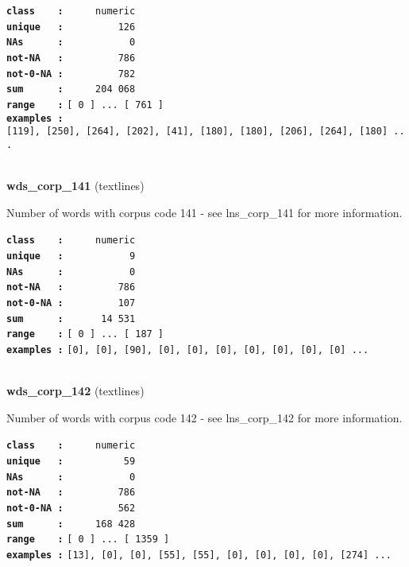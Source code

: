 \documentclass[]{article}
\begin{document}
\textbf{\texttt{class\ \ \ \ :}} \texttt{~~~~~numeric}\\
\textbf{\texttt{unique\ \ \ :}} \texttt{~~~~~~~~~126}\\
\textbf{\texttt{NAs\ \ \ \ \ \ :}} \texttt{~~~~~~~~~~~0}\\
\textbf{\texttt{not-NA\ \ \ :}} \texttt{~~~~~~~~~786}\\
\textbf{\texttt{not-0-NA\ :}} \texttt{~~~~~~~~~782}\\
\textbf{\texttt{sum\ \ \ \ \ \ :}} \texttt{~~~~~204~068}\\
\textbf{\texttt{range\ \ \ \ :}}
\texttt{{[}\ 0\ {]}\ ...\ {[}\ 761\ {]}}\\
\textbf{\texttt{examples\ :}}
\texttt{{[}119{]},\ {[}250{]},\ {[}264{]},\ {[}202{]},\ {[}41{]},\ {[}180{]},\ {[}180{]},\ {[}206{]},\ {[}264{]},\ {[}180{]}\ ...}\\

~

\textbf{wds\_corp\_141} (textlines)

Number of words with corpus code 141 - see lns\_corp\_141 for more
information.

\textbf{\texttt{class\ \ \ \ :}} \texttt{~~~~~numeric}\\
\textbf{\texttt{unique\ \ \ :}} \texttt{~~~~~~~~~~~9}\\
\textbf{\texttt{NAs\ \ \ \ \ \ :}} \texttt{~~~~~~~~~~~0}\\
\textbf{\texttt{not-NA\ \ \ :}} \texttt{~~~~~~~~~786}\\
\textbf{\texttt{not-0-NA\ :}} \texttt{~~~~~~~~~107}\\
\textbf{\texttt{sum\ \ \ \ \ \ :}} \texttt{~~~~~~14~531}\\
\textbf{\texttt{range\ \ \ \ :}}
\texttt{{[}\ 0\ {]}\ ...\ {[}\ 187\ {]}}\\
\textbf{\texttt{examples\ :}}
\texttt{{[}0{]},\ {[}0{]},\ {[}90{]},\ {[}0{]},\ {[}0{]},\ {[}0{]},\ {[}0{]},\ {[}0{]},\ {[}0{]},\ {[}0{]}\ ...}\\

~

\textbf{wds\_corp\_142} (textlines)

Number of words with corpus code 142 - see lns\_corp\_142 for more
information.

\textbf{\texttt{class\ \ \ \ :}} \texttt{~~~~~numeric}\\
\textbf{\texttt{unique\ \ \ :}} \texttt{~~~~~~~~~~59}\\
\textbf{\texttt{NAs\ \ \ \ \ \ :}} \texttt{~~~~~~~~~~~0}\\
\textbf{\texttt{not-NA\ \ \ :}} \texttt{~~~~~~~~~786}\\
\textbf{\texttt{not-0-NA\ :}} \texttt{~~~~~~~~~562}\\
\textbf{\texttt{sum\ \ \ \ \ \ :}} \texttt{~~~~~168~428}\\
\textbf{\texttt{range\ \ \ \ :}}
\texttt{{[}\ 0\ {]}\ ...\ {[}\ 1359\ {]}}\\
\textbf{\texttt{examples\ :}}
\texttt{{[}13{]},\ {[}0{]},\ {[}0{]},\ {[}55{]},\ {[}55{]},\ {[}0{]},\ {[}0{]},\ {[}0{]},\ {[}0{]},\ {[}274{]}\ ...}\\
\end{document}
